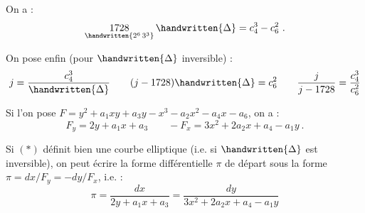 On a :
\[
 \underset{\handwritten{2^{6}\,3^{3}}}{1728}\,\handwritten{\Delta}=c_{4}^{3}-c_{6}^{2}\ .
\]

On pose enfin (pour $\handwritten{\Delta}$ inversible) :
\[
 j=\frac{c_{4}^{3}}{\handwritten{\Delta}}\qquad
 (j-1728)\handwritten{\Delta}=c_{6}^{2}\qquad
 \frac{j}{j-1728}=\frac{c_{4}^{3}}{c_{6}^{2}}
\]

Si l'on pose $F=y^{2}+a_{1}xy+a_{3}y-x^{3}-a_{2}x^{2}-a_{4}x-a_{6}$, on a :
\[
 F_{y}=2y+a_{1}x+a_{3}\qquad -F_{x}=3x^{2}+2a_{2}x+a_{4}-a_{1}y\ .
\]

Si $(\ast)$ définit bien une courbe elliptique (i.e. si $\handwritten{\Delta}$ est inversible), on peut écrire la forme différentielle $\pi$ de départ sous la forme $\pi=dx/F_{y}=-dy/F_{x}$, i.e. :
\[
 \pi=\frac{dx}{2y+a_{1}x+a_{3}}=\frac{dy}{3x^{2}+2a_{2}x+a_{4}-a_{1}y}
\]
